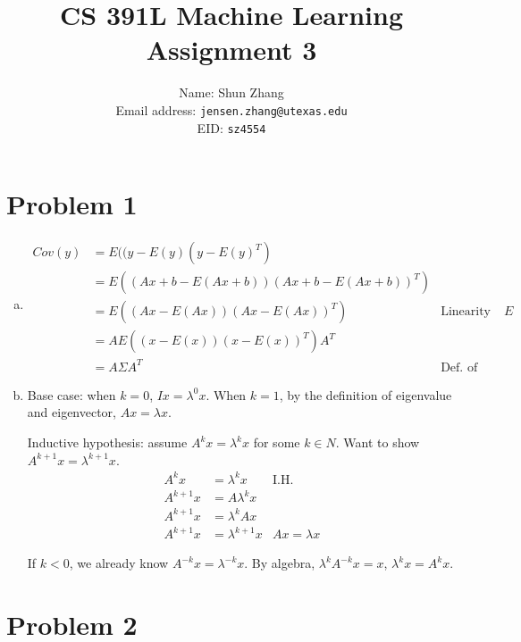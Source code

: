 \documentclass[10pt]{article}
\title{CS 391L Machine Learning Assignment 3}
\author{Name: Shun Zhang\\
Email address: \texttt{jensen.zhang@utexas.edu}\\
EID: \texttt{sz4554}}
\date{}
\begin{document}
\maketitle

\section*{Problem 1}

\begin{enumerate}[(a)]

\item \begin{align}
Cov(y) &= E((y - E(y)(y - E(y)^T)\\
&= E((Ax + b - E(Ax + b))(Ax + b - E(Ax + b))^T)\\
&= E((Ax - E(Ax))(Ax - E(Ax))^T) &\text{Linearity of $E$}\\
&= AE((x - E(x))(x - E(x))^T)A^T\\
&= A\Sigma A^T &\text{Def.\ of Cov.\ }
\end{align}

\item Base case: when $k = 0$, $I x = \lambda^0 x$. When $k = 1$, by
the definition of eigenvalue and eigenvector, $Ax = \lambda x$.

Inductive hypothesis: assume $A^k x = \lambda^k x$ for some $k \in N$.
Want to show $A^{k+1} x = \lambda^{k+1} x$.
\begin{align}
A^k x &= \lambda^k x &\text{I.H.}\\
A^{k+1} x &= A \lambda^k x\\
A^{k+1} x &= \lambda^k Ax\\
A^{k+1} x &= \lambda^{k+1} x &Ax = \lambda x
\end{align}

If $k < 0$, we already know $A^{-k} x = \lambda^{-k} x$. By algebra,
$\lambda^k A^{-k} x = x$, $\lambda^k x = A^{k} x$.

\end{enumerate}

\section*{Problem 2}
\end{document}
